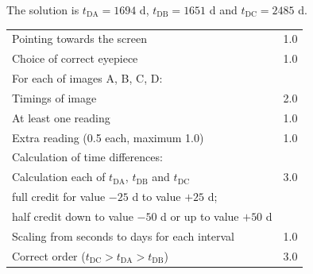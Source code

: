 The solution is $t_{\mathrm{DA}} = 1694$ d, $t_{\mathrm{DB}} = 1651$ d and
$t_{\mathrm{DC}} = 2485$ d.

\begin{center}
\begin{tabular}{l r}
\hline
Pointing towards the screen & 1.0 \\
Choice of correct eyepiece & 1.0 \\
\hline
\multicolumn{2}{l}{For each of images A, B, C, D:} \\
\quad Timings of image & 2.0 \\
\qquad At least one reading & 1.0 \\
\qquad Extra reading (0.5 each, maximum 1.0) & 1.0 \\
\hline
\multicolumn{2}{l}{Calculation of time differences:} \\
\quad Calculation each of $t_{\mathrm{DA}}$, $t_{\mathrm{DB}}$ and
  $t_{\mathrm{DC}}$ & 3.0 \\
\qquad full credit for value $-25$ d to value $+25$ d; & \\
\qquad half credit down to value $-50$ d or up to value $+50$ d & \\
\quad Scaling from seconds to days for each interval & 1.0 \\
\hline
Correct order ($t_{\mathrm{DC}} > t_{\mathrm{DA}} > t_{\mathrm{DB}}$) & 3.0 \\
\hline
\end{tabular}
\end{center}
